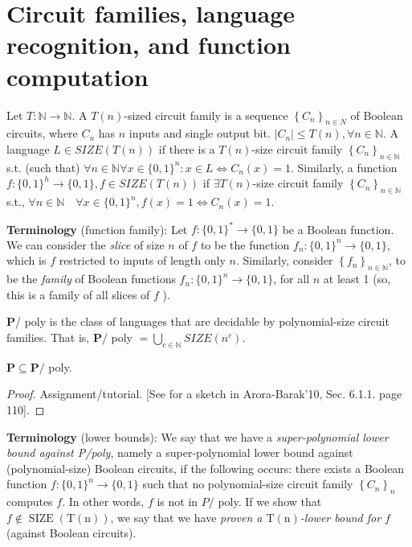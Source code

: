 \section{Circuit families, language recognition, and function computation}

\begin{definition}
Let $T:\mathbb{N}\rightarrow \mathbb{N}$. A $T(n)$-sized circuit family is a sequence $\left\{C_n\right\}_{n \in N}$ of Boolean circuits, where $C_n$ has $n$ inputs and single output bit. $\left|C_n\right| \leq T(n), \forall n \in \mathbb{N}$.
A language $L \in SIZE (T(n))$ if there is a $T(n)$-size circuit family $\left\{C_n\right\}_{n \in \mathbb{N}}$ s.t. (such that) $\forall n \in \mathbb{N} \forall x \in\{0,1\}^n: x \in L \Leftrightarrow C_n(x)=1$.
Similarly, a function $f:\{0,1\}^h \rightarrow\{0,1\}, f \in SIZE(T(n))$ if $\exists T(n)$-size circuit family $\left\{C_n\right\}_{n \in \mathbb{N}}$ s.t., $\forall n \in \mathbb{N} \quad \forall x \in\{0,1\}^n, f(x)=1 \Leftrightarrow C_n(x)=1$.
\end{definition}

\begin{svgraybox}
\textbf{Terminology} (function family):
 Let $f:\{0,1\}^*\to\{0,1\}$ be a Boolean function.
We can consider the \emph{slice} of size $n$ of $f$ to be the function $f_n:\{0,1\}^n\to\{0,1\}$, which is $f$ restricted to inputs of length only $n$. 
Similarly, consider $\left\{f_{n}\right\}_{n\in\mathbb{N}}$, to be the \textit{family} of Boolean functions $f_n:\{0,1\}^n\to \{0,1\}$, 
for all $n$ at least 1 (so, this is a family of all slices of $f$ ).
\end{svgraybox}

\begin{definition} $\mathbf{P}$/ poly is the class of languages that are decidable by polynomial-size circuit families.
That is, $\mathbf{P} /$ poly $=\bigcup_{c \in \mathbb{N}} SIZE\left(n^c\right)$.
\end{definition}


\begin{theorem}
$\mathbf{P} \subseteq \mathbf{P} /$ poly.
\end{theorem}

\begin{proof}
Assignment/tutorial.
[See for a sketch in Arora-Barak'10, Sec. 6.1.1. page 110].
\end{proof}


\begin{svgraybox}
\textbf{Terminology} (lower bounds):
We say that we have a \textit{super-polynomial lower bound against P/poly}, namely a super-polynomial lower bound against (polynomial-size) Boolean circuits, if the following occurs: there exists a Boolean function $f:\{0,1\}^n\to \{0,1\}$ such that no polynomial-size circuit family $\left\{C_n\right\}_n$ computes $f$. In other words, $f$ is not in $P /$ poly. If we show that $f\not\in\operatorname{SIZE}(\mathrm{T}(\mathrm{n}))$, we say that we have \textit{proven a $\mathrm{T}(\mathrm{n})$-lower bound for $f$ }(against Boolean circuits).
\end{svgraybox}



